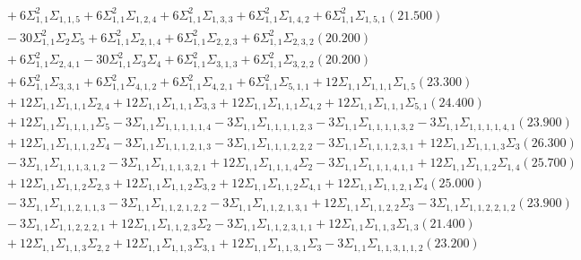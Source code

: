 \documentclass[12pt]{article}
\begin{document}
\begin{landscape}
\begin{align*}
		&\quad\quad +6\Sigma_{1,1}^{2}\Sigma_{1,1,5}+6\Sigma_{1,1}^{2}\Sigma_{1,2,4}+6\Sigma_{1,1}^{2}\Sigma_{1,3,3}+6\Sigma_{1,1}^{2}\Sigma_{1,4,2}+6\Sigma_{1,1}^{2}\Sigma_{1,5,1}(21.500) \\ 
		&\quad\quad -30\Sigma_{1,1}^{2}\Sigma_{2}\Sigma_{5}+6\Sigma_{1,1}^{2}\Sigma_{2,1,4}+6\Sigma_{1,1}^{2}\Sigma_{2,2,3}+6\Sigma_{1,1}^{2}\Sigma_{2,3,2}(20.200) \\ 
		&\quad\quad +6\Sigma_{1,1}^{2}\Sigma_{2,4,1}-30\Sigma_{1,1}^{2}\Sigma_{3}\Sigma_{4}+6\Sigma_{1,1}^{2}\Sigma_{3,1,3}+6\Sigma_{1,1}^{2}\Sigma_{3,2,2}(20.200) \\ 
		&\quad\quad +6\Sigma_{1,1}^{2}\Sigma_{3,3,1}+6\Sigma_{1,1}^{2}\Sigma_{4,1,2}+6\Sigma_{1,1}^{2}\Sigma_{4,2,1}+6\Sigma_{1,1}^{2}\Sigma_{5,1,1}+12\Sigma_{1,1}\Sigma_{1,1,1}\Sigma_{1,5}(23.300) \\ 
		&\quad\quad +12\Sigma_{1,1}\Sigma_{1,1,1}\Sigma_{2,4}+12\Sigma_{1,1}\Sigma_{1,1,1}\Sigma_{3,3}+12\Sigma_{1,1}\Sigma_{1,1,1}\Sigma_{4,2}+12\Sigma_{1,1}\Sigma_{1,1,1}\Sigma_{5,1}(24.400) \\ 
		&\quad\quad +12\Sigma_{1,1}\Sigma_{1,1,1,1}\Sigma_{5}-3\Sigma_{1,1}\Sigma_{1,1,1,1,1,4}-3\Sigma_{1,1}\Sigma_{1,1,1,1,2,3}-3\Sigma_{1,1}\Sigma_{1,1,1,1,3,2}-3\Sigma_{1,1}\Sigma_{1,1,1,1,4,1}(23.900) \\ 
		&\quad\quad +12\Sigma_{1,1}\Sigma_{1,1,1,2}\Sigma_{4}-3\Sigma_{1,1}\Sigma_{1,1,1,2,1,3}-3\Sigma_{1,1}\Sigma_{1,1,1,2,2,2}-3\Sigma_{1,1}\Sigma_{1,1,1,2,3,1}+12\Sigma_{1,1}\Sigma_{1,1,1,3}\Sigma_{3}(26.300) \\ 
		&\quad\quad -3\Sigma_{1,1}\Sigma_{1,1,1,3,1,2}-3\Sigma_{1,1}\Sigma_{1,1,1,3,2,1}+12\Sigma_{1,1}\Sigma_{1,1,1,4}\Sigma_{2}-3\Sigma_{1,1}\Sigma_{1,1,1,4,1,1}+12\Sigma_{1,1}\Sigma_{1,1,2}\Sigma_{1,4}(25.700) \\ 
		&\quad\quad +12\Sigma_{1,1}\Sigma_{1,1,2}\Sigma_{2,3}+12\Sigma_{1,1}\Sigma_{1,1,2}\Sigma_{3,2}+12\Sigma_{1,1}\Sigma_{1,1,2}\Sigma_{4,1}+12\Sigma_{1,1}\Sigma_{1,1,2,1}\Sigma_{4}(25.000) \\ 
		&\quad\quad -3\Sigma_{1,1}\Sigma_{1,1,2,1,1,3}-3\Sigma_{1,1}\Sigma_{1,1,2,1,2,2}-3\Sigma_{1,1}\Sigma_{1,1,2,1,3,1}+12\Sigma_{1,1}\Sigma_{1,1,2,2}\Sigma_{3}-3\Sigma_{1,1}\Sigma_{1,1,2,2,1,2}(23.900) \\ 
		&\quad\quad -3\Sigma_{1,1}\Sigma_{1,1,2,2,2,1}+12\Sigma_{1,1}\Sigma_{1,1,2,3}\Sigma_{2}-3\Sigma_{1,1}\Sigma_{1,1,2,3,1,1}+12\Sigma_{1,1}\Sigma_{1,1,3}\Sigma_{1,3}(21.400) \\ 
		&\quad\quad +12\Sigma_{1,1}\Sigma_{1,1,3}\Sigma_{2,2}+12\Sigma_{1,1}\Sigma_{1,1,3}\Sigma_{3,1}+12\Sigma_{1,1}\Sigma_{1,1,3,1}\Sigma_{3}-3\Sigma_{1,1}\Sigma_{1,1,3,1,1,2}(23.200) \\ 

\end{align*}
\end{landscape}
\end{document}
